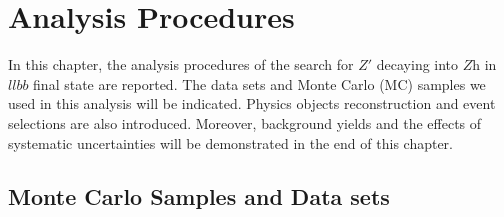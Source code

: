 
\chapter{Analysis Procedures}

In this chapter, the analysis procedures of the search for $Z'$ decaying into $Z$h in $llbb$ final state are reported. The data sets and Monte Carlo (MC) samples we used in this analysis will be indicated. Physics objects reconstruction and event selections are also introduced. Moreover, background yields and the effects of systematic uncertainties will be demonstrated in the end of this chapter.

\section{Monte Carlo Samples and Data sets}

